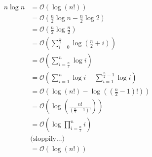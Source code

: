 \documentclass{article}
\begin{document}
\begin{align*}
    n \log n &= \mathcal{O}(\log(n!)) \\
    &= \mathcal{O} \left(\frac{n}{2} \log n - \frac{n}{2} \log 2 \right) \\
    &= \mathcal{O} \left(\frac{n}{2} \log \frac{n}{2} \right) \\
    &= \mathcal{O} \left(\sum_{i = 0}^{\frac{n}{2}} \log \left(\frac{n}{2} + i\right) \right) \\
    &= \mathcal{O} \left(\sum_{i = \frac{n}{2}}^{n} \log i \right) \\
    &= \mathcal{O} \left(\sum_{i = 1}^{n} \log i - \sum_{i = 1}^{\frac{n}{2} - 1} \log i \right) \\
    &= \mathcal{O} \left(\log(n!) - \log \left(\left(\frac{n}{2} - 1\right)! \right) \right) \\
    &= \mathcal{O} \left(\log \left(\frac{n!}{(\frac{n}{2} - 1)!} \right) \right) \\
    &= \mathcal{O} \left(\log \prod_{i = \frac{n}{2}}^{n} i \right) \\
    &\text{(sloppily...)} \\
    &= \mathcal{O}(\log(n!))
\end{align*}
\end{document}
